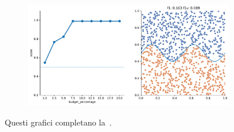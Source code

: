 \begin{appendices}
\begin{figure}
\begin{subfigure}{.5\textwidth}
    \end{subfigure}%
    \hfill
    \begin{subfigure}{.5\textwidth}
        \centering
        \includegraphics[width=\textwidth]{img/2d_v2/11.pdf}
    \end{subfigure}
\caption{Questi grafici completano la~.}
\end{figure}

\end{appendices}